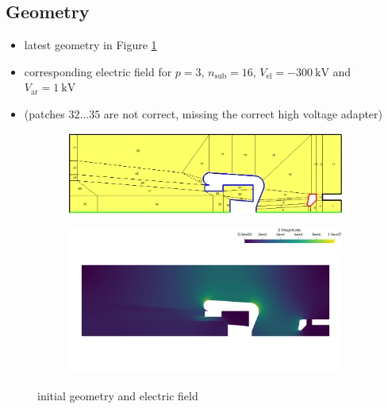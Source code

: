 \subsection{Geometry}
\begin{itemize}
   \item latest geometry in Figure \ref{fig:init}
   \item corresponding electric field for $p=3$, $n_\mathrm{sub}=16$,  $V_\mathrm{el}=-300\ \mathrm{kV}$ and $V_\mathrm{ar}=1\ \mathrm{kV}$
   \item (patches $32 \dots 35$ are not correct, missing the correct high voltage adapter)
\end{itemize}

\begin{center}
\begin{figure}[H]
   \begin{subfigure}{0.45\textwidth}
      \includegraphics[width=\textwidth]{fig/geometry_v6}
   \end{subfigure}
   \begin{subfigure}{0.45\textwidth}
      \includegraphics[width=\textwidth]{fig/E_v6}
   \end{subfigure}
   \caption{initial geometry and electric field}
   \label{fig:init}
\end{figure}
\end{center}

